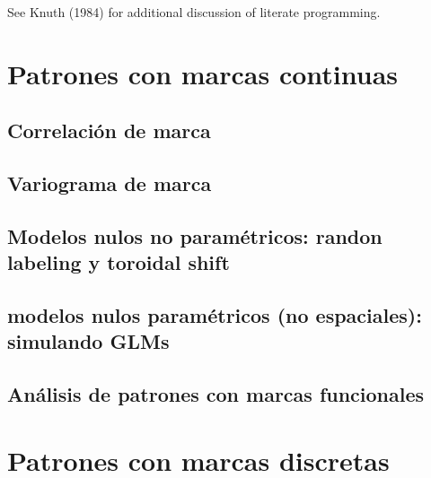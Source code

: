 \documentclass[
  letterpaper,
  DIV=11,
  numbers=noendperiod]{scrreprt}
\begin{document}
See Knuth (1984) for additional discussion of literate programming.


\hypertarget{patrones-con-marcas-continuas}{%
\chapter{Patrones con marcas
continuas}\label{patrones-con-marcas-continuas}}

\hypertarget{correlaciuxf3n-de-marca}{%
\section{Correlación de marca}\label{correlaciuxf3n-de-marca}}

\hypertarget{variograma-de-marca}{%
\section{Variograma de marca}\label{variograma-de-marca}}

\hypertarget{modelos-nulos-no-paramuxe9tricos-randon-labeling-y-toroidal-shift}{%
\section{Modelos nulos no paramétricos: randon labeling y toroidal
shift}\label{modelos-nulos-no-paramuxe9tricos-randon-labeling-y-toroidal-shift}}

\hypertarget{modelos-nulos-paramuxe9tricos-no-espaciales-simulando-glms}{%
\section{modelos nulos paramétricos (no espaciales): simulando
GLMs}\label{modelos-nulos-paramuxe9tricos-no-espaciales-simulando-glms}}

\hypertarget{anuxe1lisis-de-patrones-con-marcas-funcionales}{%
\section{Análisis de patrones con marcas
funcionales}\label{anuxe1lisis-de-patrones-con-marcas-funcionales}}


\hypertarget{patrones-con-marcas-discretas}{%
\chapter{Patrones con marcas
discretas}\label{patrones-con-marcas-discretas}}
\end{document}
